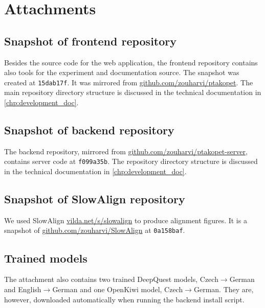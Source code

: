 \chapter{Attachments}

\section{Snapshot of \ptakopet{} frontend repository}
Besides the source code for the web application, the frontend repository contains also tools for the experiment and documentation source. The snapshot was created at \texttt{15dab17f}. It was mirrored from \href{https://github.com/zouharvi/ptakopet}{github.com/zouharvi/ptakopet}. The main repository directory structure is discussed in the technical documentation in \cref{chp:development_doc}.

\section{Snapshot of \ptakopet{} backend repository}
The backend repository, mirrored from \href{https://github.com/zouharvi/ptakopet-server}{github.com/zouharvi/ptakopet-server}, contains server code at \texttt{f099a35b}. The repository directory structure is discussed in the technical documentation in \cref{chp:development_doc}.

\section{Snapshot of SlowAlign repository}
We used SlowAlign \href{https://vilda.net/s/slowalign/}{vilda.net/s/slowalign} to produce alignment figures. It is a snapshot of \href{https://github.com/zouharvi/SlowAlign}{github.com/zouharvi/SlowAlign} at \texttt{0a158baf}.

\section{Trained models}
The attachment also contains two trained DeepQuest models, Czech$\rightarrow$German and English$\rightarrow$German and one OpenKiwi model, Czech$\rightarrow$German. They are, however, downloaded automatically when running the backend install script.

